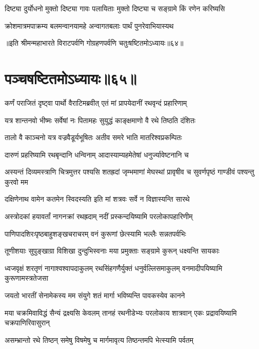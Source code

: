 \twolineshloka
{दिष्ट्या दुर्योधनो मुक्तो दिष्ट्या गावः पलायिताः}
{मुक्तो दिष्ट्या च सङ्ग्रामे किं रणेन करिष्यसि}


\twolineshloka
{क्रोशमात्रमपाक्रम्य बलमन्वानयामहे}
{अन्वागतबलाः पार्थं पुनरेवाभियास्यथ}

॥इति श्रीमन्महाभारते विराटपर्वणि गोग्रहणपर्वणि चतुःषष्टितमोऽध्यायः॥६४॥

\chapter{पञ्चषष्टितमोऽध्यायः॥६५॥}

\twolineshloka
{कर्णं पराजितं दृष्ट्वा पार्थो वैराटिमब्रवीत्}
{एतं मां प्रापयेदानीं रथवृन्दं प्रहारिणाम्}


\twolineshloka
{यत्र शान्तनवो भीष्मः सर्वेषां नः पितामहः}
{सुयुद्धं काङ्क्षमाणो वै रथे तिष्ठति दंशितः}


\twolineshloka
{तालो वै काञ्चनो यत्र वज्रवैडूर्यभूषितः}
{अतीव समरे भाति मातरिश्वप्रकम्पितः}


\twolineshloka
{दारुणं प्रहरिष्यामि रथबृन्दानि धन्विनाम्}
{आदास्याम्यहमेतेषां धनुर्ज्यावेष्टनानि च}


\onelineshloka
{अस्यन्तं दिव्यमस्त्राणि चित्रमुत्तर पश्यसि}
\twolineshloka
{शतह्रदां जृम्भमाणां मेघस्थां प्रावृषीव च}
{सुवर्णपृष्ठं गाण्डीवं पश्यन्तु कुरवो मम}


\twolineshloka
{दक्षिणेनाथ वामेन कतमेन स्विदस्यति}
{इति मां शत्रवः सर्वे न विज्ञास्यन्ति सारथे}


\twolineshloka
{अस्त्रोदकां हयावर्तां नागनक्रां रथह्रदाम्}
{नदीं प्रस्कन्दयिष्यामि परलोकापहारिणीम्}


\twolineshloka
{पाणिपादशिरःपृष्ठबाहुशङ्खचराचरम्}
{वनं कुरूणां छेत्स्यामि भल्लैः सन्नतपर्वभिः}


\twolineshloka
{तूणीशयाः सुपुङ्खाग्रा विशिखा दुन्दुभिस्वनाः}
{मया प्रमुक्ताः सङ्ग्रामे कुरून् धक्ष्यन्ति सायकाः}


\threelineshloka
{ध्वजवृक्षं शरतृणं नागाश्वश्वापदाकुलम्}
{रथसिंहगणैर्युक्तं धनुर्वल्लिसमाकुलम्}
{वनमादीपयिष्यामि कुरूणामस्त्रतेजसा}


\twolineshloka
{जयतो भारतीं सेनामेकस्य मम संयुगे}
{शतं मार्गा भविष्यन्ति पावकस्येव कानने}


\threelineshloka
{मया चक्रमिवाविद्धं सैन्यं द्रक्ष्यसि केवलम्}
{तानहं रथनीडेभ्यः परलोकाय शात्रवान्}
{एकः प्रद्रावयिष्यामि चक्रपाणिरिवासुरान्}


\twolineshloka
{असम्भ्रान्तो रथे तिष्ठन् समेषु विषमेषु च}
{मार्गमावृत्य तिष्ठन्तमपि भेत्स्यामि पर्वतम्}


